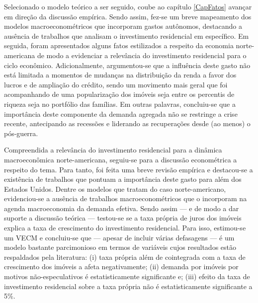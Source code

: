 Selecionado o modelo teórico a ser seguido, coube ao capítulo \ref{CapFatos} avançar em direção da discussão empírica.
Sendo assim, fez-se um breve mapeamento dos modelos macroeconométricos que incorporam gastos autônomos, destacando a ausência de trabalhos que analisam o investimento residencial em específico.
Em seguida, foram apresentados alguns fatos estilizados a respeito da economia norte-americana de modo a evidenciar a relevância do investimento residencial para o ciclo econômico.
Adicionalmente, argumentou-se que a influência deste gasto não está limitada a momentos de mudanças na distribuição da renda a favor dos lucros e de ampliação do crédito, sendo um movimento mais geral que foi acompanhando de uma popularização dos imóveis seja entre os percentis de riqueza seja no portfólio das famílias.
Em outras palavras,
concluiu-se que a importância deste componente da demanda agregada não se restringe a crise recente, antecipando as recessões  e liderando as recuperações desde (ao menos) o pós-guerra.


Compreendida a relevância do investimento residencial para a dinâmica macroeconômica norte-americana, seguiu-se para a discussão econométrica a respeito do tema.
Para tanto, foi feita uma breve revisão empírica e destacou-se a existência de trabalhos que pontuam a importância deste gasto para além dos Estados Unidos.
Dentre os modelos que tratam do caso norte-americano, evidenciou-se a ausência de trabalhos macroeconométricos que o incorporam na agenda macroeconomia da demanda efetiva.
Sendo assim --- e de modo a dar suporte a discussão teórica --- testou-se se a taxa própria de juros dos imóveis explica a taxa de crescimento do investimento residencial.
Para isso, estimou-se um VECM  e concluiu-se que --- apesar de incluir várias defasagens --- é um modelo bastante parcimonioso em termos de variáveis cujos resultados estão respaldados pela literatura:
(i) taxa própria além de cointegrada com a taxa de crescimento dos imóveis a afeta negativamente; (ii) demanda por imóveis por motivos não-especulativos é estatisticamente significante e; (iii) efeito da taxa de investimento residencial sobre a taxa própria não é estatisticamente significante a 5\%.


